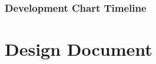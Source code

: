 \documentclass[onecolumn, draftclsnofoot, 10pt, compsoc]{IEEEtran}
\begin{document}
\subsubsection{Development Chart Timeline}
\begin{center}
\end{center}

\newpage
\section{Design Document}
\end{document}

